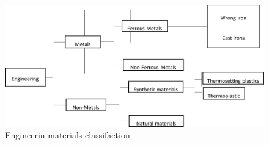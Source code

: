 \documentclass[12pt]{report}
\begin{document}
\begin{figure}[H]
    \centering
    \includegraphics[width=\textwidth]{materials_classification.png}
    \caption{Engineerin materials classifaction \cite{timings2008fabrication}}
    \label{ch3:figure:materials}
\end{figure}
\end{document}
